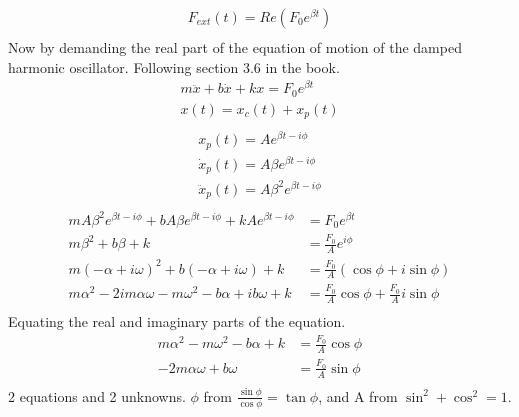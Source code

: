 \documentclass[]{article}
\begin{document}
	\begin{equation}
		\begin{split}
			F_{ext}(t) = Re(F_0 e^{\beta t}) \\
		\end{split}
	\end{equation}
	Now by demanding the real part of the equation of motion of the damped harmonic oscillator. Following section 3.6 in the book.
	\begin{equation}
		\begin{split}
			m\ddot{x} + b\dot{x} + kx = F_0 e^{\beta t} \\
			x(t) = x_c(t) + x_p(t) \\
		\end{split}
	\end{equation}
	\begin{equation}
		\begin{split}
			x_p(t) = Ae^{\beta t - i \phi} \\
			\dot{x}_p(t) = A\beta e^{\beta t - i \phi} \\
			\ddot{x}_p(t) = A\beta^2 e^{\beta t - i \phi} \\
		\end{split}
	\end{equation}
	\begin{equation}
		\begin{split}
			mA\beta^2 e^{\beta t - i \phi} + bA\beta e^{\beta t - i \phi} + kAe^{\beta t - i \phi} &= F_0 e^{\beta t} \\
			m\beta^2 + b\beta + k &= \frac{F_0}{A} e^{i \phi} \\
			m(-\alpha + i \omega)^2 + b(-\alpha + i \omega) + k &= \frac{F_0}{A} (\cos \phi + i\sin \phi) \\
			m\alpha^2 - 2im\alpha \omega - m\omega^2 - b\alpha + ib\omega + k &= \frac{F_0}{A} \cos \phi + \frac{F_0}{A} i\sin \phi \\
		\end{split}
	\end{equation}
	Equating the real and imaginary parts of the equation.
	\begin{equation}
		\begin{split}
			m\alpha^2 - m\omega^2 - b\alpha + k &= \frac{F_0}{A} \cos \phi \\
			- 2m\alpha \omega + b\omega &= \frac{F_0}{A} \sin \phi \\
		\end{split}
	\end{equation}
	2 equations and 2 unknowns. $ \phi $ from $ \frac{\sin \phi}{\cos \phi} = \tan \phi $, and A from $ \sin^2 +\cos^2 = 1 $.
\end{document}
